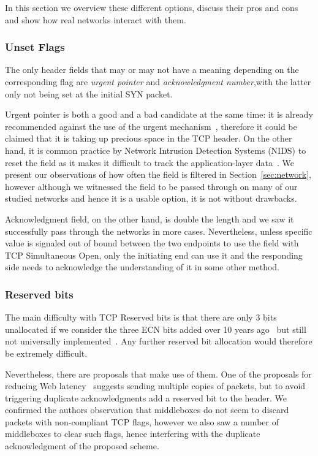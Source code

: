 \documentclass{sig-alternate-10pt}
\begin{document}
In this section we overview these different options, discuss their pros and cons and show how real networks interact with them.

\subsubsection*{Unset Flags}

The only header fields that may or may not have a meaning depending on the corresponding flag are \emph{urgent pointer} and \emph{acknowledgment number},with the latter only not being set at the initial SYN packet.

Urgent pointer is both a good and a bad candidate at the same time: it is already recommended against the use of the urgent mechanism~\cite{Gont:2011vi}, therefore it could be claimed that it is taking up precious space in the TCP header. On the other hand, it is common practice by Network Intrusion Detection Systems (NIDS) to reset the field as it makes it difficult to track the application-layer data~\cite{seolma}. We present our observations of how often the field is filtered in Section~\ref{sec:network}, however although we witnessed the field to be passed through on many of our studied networks and hence it is a usable option, it is not without drawbacks.

Acknowledgment field, on the other hand, is double the length and we saw it successfully pass through the networks in more cases. Nevertheless, unless specific value is signaled out of bound between the two endpoints to use the field with TCP Simultaneous Open, only the initiating end can use it and the responding side needs to acknowledge the understanding of it in some other method. 

\subsubsection*{Reserved bits}

The main difficulty with TCP Reserved bits is that there are only 3 bits unallocated if we consider the three ECN bits added over 10 years ago~\cite{Floyd:up,Ely:uc} but still not universally implemented~\cite{}. Any further reserved bit allocation would therefore be extremely difficult.

Nevertheless, there are proposals that make use of them. One of the proposals for reducing Web latency~\cite{Flach:2013uy} suggests sending multiple copies of packets, but to avoid triggering duplicate acknowledgments add a reserved bit to the header. We confirmed the authors observation that middleboxes do not seem to discard packets with non-compliant TCP flags, however we also saw a number of middleboxes to clear such flags, hence interfering with the duplicate acknowledgment of the proposed scheme.
\end{document}
